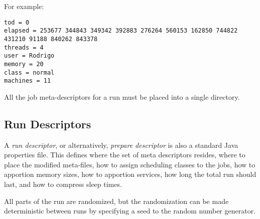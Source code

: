        For example:
\begin{verbatim}
tod = 0
elapsed = 253677 344843 349342 392883 276264 560153 162850 744822 431210 91188 840262 843378 
threads = 4
user = Rodrigo
memory = 20
class = normal
machines = 11
\end{verbatim}

       All the job meta-descriptors for a run must be placed into a single directory.


     \subsection{Run Descriptors}
     \label{subsec:simulation.run-description}
     A {\em run descriptor}, or alternatively, {\em prepare descriptor} is also a
     standard Java properties file.  This defines where the set of meta descriptors resides,
     where to place the modified meta-files, how to assign scheduling classes to the
     jobs, how to apportion memory sizes, how to apportion services, how long the total
     run should last, and how to compress sleep times.  

     All parts of the run are randomized, but the randomization can be made deterministic
     between runs by specifying a seed to the random number generator.

